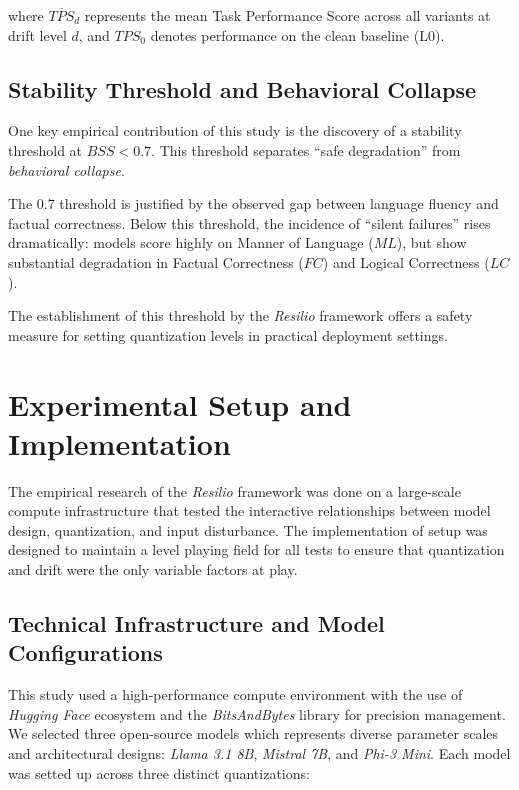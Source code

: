 \documentclass[conference]{IEEEtran}
\begin{document}
where $\overline{TPS}_d$ represents the mean Task Performance Score across all variants at drift level $d$, and $TPS_0$ denotes performance on the clean baseline (L0).

\subsection{Stability Threshold and Behavioral Collapse}

One key empirical contribution of this study is the discovery of a stability threshold at $BSS < 0.7$. This threshold separates ``safe degradation'' from \textit{behavioral collapse}.

The 0.7 threshold is justified by the observed gap between language fluency and factual correctness. Below this threshold, the incidence of ``silent failures'' rises dramatically: models score highly on Manner of Language ($ML$), but show substantial degradation in Factual Correctness ($FC$) and Logical Correctness ($LC$).

The establishment of this threshold by the \textit{Resilio} framework offers a safety measure for setting quantization levels in practical deployment settings.





\section{Experimental Setup and Implementation}

The empirical research of the \textit{Resilio} framework was done on a large-scale compute infrastructure that tested the interactive relationships between model design, quantization, and input disturbance. The implementation of setup was designed to maintain a level playing field for all tests to ensure that quantization and drift were the only variable factors at play.

\subsection{Technical Infrastructure and Model Configurations}

This study used a high-performance compute environment with the use of \textit{Hugging Face} ecosystem and the \textit{BitsAndBytes} library for precision management. We selected three open-source models which represents diverse parameter scales and architectural designs: \textit{Llama 3.1 8B}, \textit{Mistral 7B}, and \textit{Phi-3 Mini}. Each model was setted up across three distinct quantizations:
\end{document}
